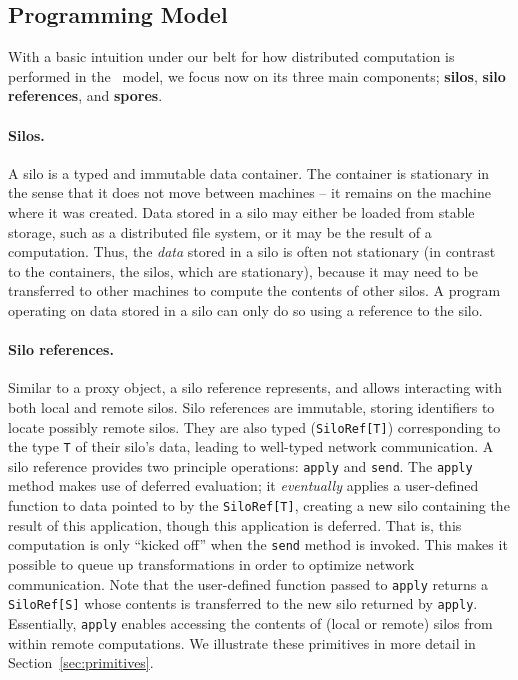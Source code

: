 \documentclass{jfp1}
\begin{document}
\subsection{Programming Model}
\label{sec:programming-model}

With a basic intuition under our belt for how distributed computation is
performed in the \FP~model, we focus now on its three main components;
\textbf{silos}, \textbf{silo references}, and \textbf{spores}.


\paragraph{Silos.}

A silo is a typed and immutable data container. The container is
stationary in the sense that it does not move between machines -- it
remains on the machine where it was created. Data stored in a silo may
either be loaded from stable storage, such as a distributed file
system, or it may be the result of a computation. Thus, the {\em data}
stored in a silo is often not stationary (in contrast to the
containers, the silos, which are stationary), because it may need to
be transferred to other machines to compute the contents of other
silos. A program operating on data stored in a silo can only do so
using a reference to the silo.

\paragraph{Silo references.}

Similar to a proxy object, a silo reference represents, and allows interacting
with both local and remote silos. Silo references are immutable, storing
identifiers to locate possibly remote silos. They are also typed
(\verb|SiloRef[T]|) corresponding to the type \verb|T| of their silo's data,
leading to well-typed network communication. A silo reference provides two
principle operations:
\verb|apply| and \verb|send|. The \verb|apply| method makes use of deferred
evaluation; it {\em eventually} applies a user-defined function to data pointed
to by the \verb|SiloRef[T]|, creating a new silo containing the result of this
application, though this application is deferred. That is, this computation is only ``kicked
off'' when the \verb|send| method is invoked. This makes it possible to queue up
transformations in order to optimize network communication.
Note that the user-defined function passed to \verb|apply| returns
a \verb|SiloRef[S]| whose contents is transferred to the new silo returned by
\verb|apply|. Essentially, \verb|apply| enables accessing the contents of
(local or remote) silos from within remote computations. We illustrate these
primitives in more detail in Section~\ref{sec:primitives}.
\end{document}

